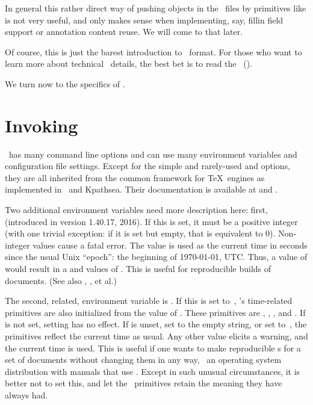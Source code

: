 \documentclass{pdftexmanual}
\begin{document}
In general this rather direct way of pushing objects in the \PDF\ files
by primitives like  is not very useful, and only makes
sense when implementing, say, fill\hyph in field support or annotation
content reuse. We will come to that later.

Of course, this is just the barest introduction to \PDF\ format. For
those who want to learn more about technical \PDF\ details, the best bet
is to read the \PDFReference\ ().

We turn now to the specifics of \PDFTEX.

\chapter{Invoking \PDFTEX}

\PDFTEX\ has many command line options and can use many environment
variables and configuration file settings. Except for the simple and
rarely-used  and  options, they
are all inherited from the common framework for \TeX\ engines as
implemented in \WEBC\ and Kpathsea. Their documentation is available at
 and .

Two additional environment variables need more description here: first,
 (introduced in version 1.40.17, 2016). If this
is set, it must be a positive integer (with one trivial exception: if it
is set but empty, that is equivalent to 0). Non-integer values cause a
fatal error. The value is used as the current time in seconds since the
usual Unix ``epoch'': the beginning of 1970-01-01, UTC. Thus, a value of
 would result in a  and 
values of . This is useful for reproducible builds
of documents. (See also , ,
et al.)

The second, related, environment variable is .
If this is set to~, \TEX's time-related primitives are also
initialized from the value of . These primitives
are , , , and . If
 is not set, setting 
has no effect. If  is unset, set to the empty
string, or set to~, the primitives reflect the current time as
usual. Any other value elicits a warning, and the current time is used.
This is useful if one wants to make reproducible \PDF{}s for a set
of documents without changing them in any way, \eg\ an operating system
distribution with manuals that use . Except in such unusual
circumstances, it is better not to set this, and let the \TEX\
primitives retain the meaning they have always had.
\end{document}
